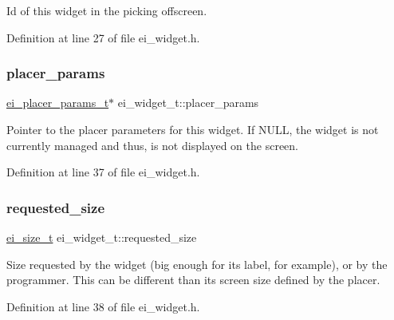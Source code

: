 Id of this widget in the picking offscreen. 



Definition at line 27 of file ei\+\_\+widget.\+h.

\mbox{\label{structei__widget__t_a82c675bf68aa3fa5b14b1f20bd157897}} 
\subsubsection{\texorpdfstring{placer\+\_\+params}{placer\_params}}
{\footnotesize\ttfamily \hyperlink{structei__placer__params__t}{ei\+\_\+placer\+\_\+params\+\_\+t}$\ast$ ei\+\_\+widget\+\_\+t\+::placer\+\_\+params}



Pointer to the placer parameters for this widget. If N\+U\+LL, the widget is not currently managed and thus, is not displayed on the screen. 



Definition at line 37 of file ei\+\_\+widget.\+h.

\mbox{\label{structei__widget__t_ae82b19958b3ec72a855986dffb9b92ea}} 
\subsubsection{\texorpdfstring{requested\+\_\+size}{requested\_size}}
{\footnotesize\ttfamily \hyperlink{structei__size__t}{ei\+\_\+size\+\_\+t} ei\+\_\+widget\+\_\+t\+::requested\+\_\+size}



Size requested by the widget (big enough for its label, for example), or by the programmer. This can be different than its screen size defined by the placer. 



Definition at line 38 of file ei\+\_\+widget.\+h.

\mbox{\label{structei__widget__t_ad139e1541329b54e0b4c8d746e14b204}} 
